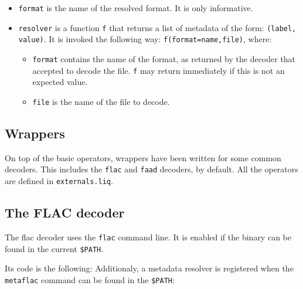 \documentclass{book}
\begin{document}
\begin{itemize}
\item \verb+format+ is the name of the resolved format. It is only informative.
\item \verb+resolver+ is a function \verb+f+ that returns a list of metadata of
  the form: \verb+(label, value)+. It is invoked the following way:
  \verb+f(format=name,file)+, where:\begin{itemize}
  \item \verb+format+ contains the name of the format, as returned by the
    decoder that accepted to decode the file. \verb+f+ may return immediately if
    this is not an expected value.
  \item \verb+file+ is the name of the file to decode.
\end{itemize}
\end{itemize}

\subsection{Wrappers}
On top of the basic operators, wrappers have been written for some common
decoders. This includes the \verb+flac+ and \verb+faad+ decoders, by
default. All the operators are defined in \verb+externals.liq+.

\subsection{The FLAC decoder}
The flac decoder uses the \verb+flac+ command line. It is enabled if the binary
can be found in the current \verb+$PATH+.

Its code is the following:
Additionaly, a metadata resolver is registered when the \verb+metaflac+ command
can be found in the \verb+$PATH+:
\end{document}

